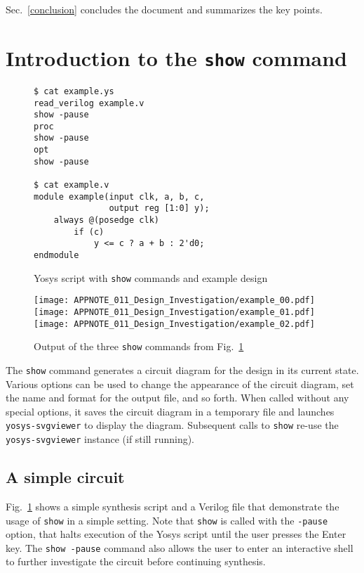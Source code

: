 \documentclass[9pt,technote,a4paper]{IEEEtran}
\begin{document}
Sec.~\ref{conclusion} concludes the document and summarizes the key points.

\section{Introduction to the {\tt show} command}
\label{intro_show}

\begin{figure}[b]
\begin{lstlisting}
$ cat example.ys
read_verilog example.v
show -pause
proc
show -pause
opt
show -pause

$ cat example.v
module example(input clk, a, b, c,
               output reg [1:0] y);
    always @(posedge clk)
        if (c)
            y <= c ? a + b : 2'd0;
endmodule
\end{lstlisting}
\caption{Yosys script with {\tt show} commands and example design}
\label{example_src}
\end{figure}

\begin{figure}[b!]
\texttt{[image: APPNOTE\_011\_Design\_Investigation/example\_00.pdf]}
\texttt{[image: APPNOTE\_011\_Design\_Investigation/example\_01.pdf]}
\texttt{[image: APPNOTE\_011\_Design\_Investigation/example\_02.pdf]}
\caption{Output of the three {\tt show} commands from Fig.~\ref{example_src}}
\label{example_out}
\end{figure}

The {\tt show} command generates a circuit diagram for the design in its
current state. Various options can be used to change the appearance of the
circuit diagram, set the name and format for the output file, and so forth.
When called without any special options, it saves the circuit diagram in
a temporary file and launches {\tt yosys-svgviewer} to display the diagram.
Subsequent calls to {\tt show} re-use the {\tt yosys-svgviewer} instance
(if still running).

\subsection{A simple circuit}

Fig.~\ref{example_src} shows a simple synthesis script and a Verilog file that
demonstrate the usage of {\tt show} in a simple setting. Note that {\tt show}
is called with the {\tt -pause} option, that halts execution of the Yosys
script until the user presses the Enter key. The {\tt show -pause} command
also allows the user to enter an interactive shell to further investigate the
circuit before continuing synthesis.
\end{document}

